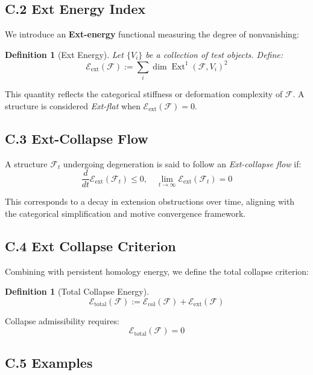 \documentclass[11pt]{article}
\newtheorem{definition}[theorem]{Definition}
\DeclareMathOperator{\Ext}{Ext}
\begin{document}
\subsection*{C.2 Ext Energy Index}

We introduce an \textbf{Ext-energy} functional measuring the degree of nonvanishing:

\begin{definition}[Ext Energy]
Let $\{ V_i \}$ be a collection of test objects. Define:
\[
\mathcal{E}_{\mathrm{ext}}(\mathcal{F}) := \sum_{i} \dim \Ext^1(\mathcal{F}, V_i)^2
\]
\end{definition}

This quantity reflects the categorical stiffness or deformation complexity of $\mathcal{F}$. A structure is considered \emph{Ext-flat} when $\mathcal{E}_{\mathrm{ext}}(\mathcal{F}) = 0$.

\subsection*{C.3 Ext-Collapse Flow}

A structure $\mathcal{F}_t$ undergoing degeneration is said to follow an \emph{Ext-collapse flow} if:
\[
\frac{d}{dt} \mathcal{E}_{\mathrm{ext}}(\mathcal{F}_t) \leq 0, \quad \lim_{t \to \infty} \mathcal{E}_{\mathrm{ext}}(\mathcal{F}_t) = 0
\]

This corresponds to a decay in extension obstructions over time, aligning with the categorical simplification and motive convergence framework.

\subsection*{C.4 Ext Collapse Criterion}

Combining with persistent homology energy, we define the total collapse criterion:

\begin{definition}[Total Collapse Energy]
\[
\mathcal{E}_{\mathrm{total}}(\mathcal{F}) := \mathcal{E}_{\mathrm{col}}(\mathcal{F}) + \mathcal{E}_{\mathrm{ext}}(\mathcal{F})
\]
\end{definition}

Collapse admissibility requires:
\[
\mathcal{E}_{\mathrm{total}}(\mathcal{F}) = 0
\]

\subsection*{C.5 Examples}
\end{document}
